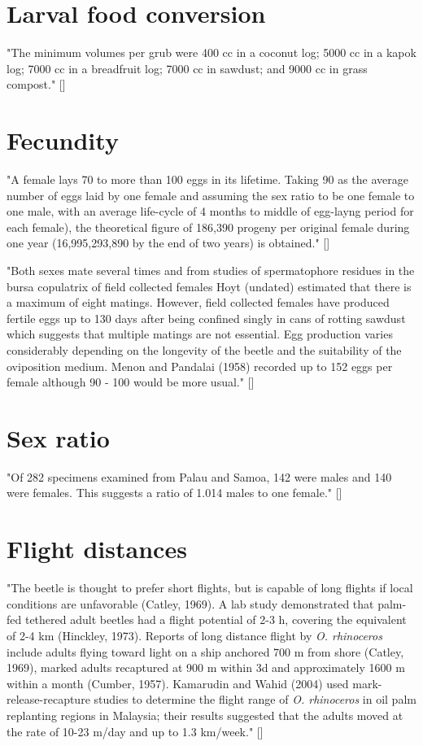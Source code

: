 \documentclass[12pt,letterpaper,english,bibliography=totocnumbered, abstract=on]{scrartcl}
\begin{document}
\section{Larval food conversion}

"The minimum volumes per grub were 400 cc in a coconut log; 5000 cc in a kapok log; 7000 cc in a breadfruit log; 7000 cc in sawdust; and 9000 cc in grass compost." [\cite{hinckley_ecology_1973}]
\section{Fecundity}

"A female lays 70 to more than 100 eggs in its lifetime. Taking 90 as the average number of eggs laid by one female and assuming the sex ratio to be one female to one male, with an average life-cycle of 4 months to middle of egg-layng period for each female), the theoretical figure of 186,390 progeny per original female during one year (16,995,293,890 by the end of two years) is obtained." [\cite{gressitt_coconut_1953}]

"Both sexes mate several times and from studies of spermatophore residues in the bursa copulatrix
of field collected females Hoyt (undated) estimated that there is a maximum of eight matings. However,
field collected females have produced fertile eggs up to 130 days after being confined singly in cans of
rotting sawdust which suggests that multiple matings are not essential. Egg production varies considerably
depending on the longevity of the beetle and the suitability of the oviposition medium. Menon and Pandalai (1958) recorded up to 152 eggs per female although 90 - 100 would be more usual." [\cite{catley_coconut_1969}]

\section{Sex ratio}

"Of 282 specimens examined from Palau and Samoa, 142 were males and 140 were females. This suggests a ratio of 1.014 males to one female." [\cite{gressitt_coconut_1953}]

\section{Flight distances}
"The beetle is thought to prefer short flights, but
is capable of long flights if local conditions are unfavorable (Catley, 1969). A
lab study demonstrated that palm-fed tethered adult beetles had a flight
potential of 2-3 h, covering the equivalent of 2-4 km (Hinckley, 1973).
Reports of long distance flight by \textit{O. rhinoceros} include adults flying toward
light on a ship anchored 700 m from shore (Catley, 1969), marked adults
recaptured at 900 m within 3d and approximately 1600 m within a month
(Cumber, 1957). Kamarudin and Wahid (2004) used mark-release-recapture
studies to determine the flight range of \textit{O. rhinoceros} in oil palm replanting
regions in Malaysia; their results suggested that the adults moved at the rate of
10-23 m/day and up to 1.3 km/week." [\cite{pallipparambil_new_2015}]
\end{document}
